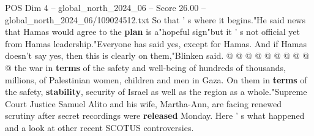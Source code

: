 \begin{textsample}{POS Dim 4 – global\_north\_2024\_06 – Score 26.00 – global\_north\_2024\_06/109024512.txt}
So that ' s where it begins."He said news that Hamas would agree to the \textbf{plan} is a"hopeful sign"but it ' s not official yet from Hamas leadership."Everyone has said yes, except for Hamas.
And if Hamas doesn't say yes, then this is clearly on them,"Blinken said. @ @ @ @ @ @ @ @ @ @ the war in \textbf{terms} of the safety and well-being of hundreds of thousands, millions, of Palestinian women, children and men in Gaza.
On them in \textbf{terms} of the safety, \textbf{stability}, security of Israel as well as the region as a whole."Supreme Court Justice Samuel Alito and his wife, Martha-Ann, are facing renewed scrutiny after secret recordings were \textbf{released} Monday.
Here ' s what happened and a look at other recent SCOTUS controversies.

\end{textsample}
